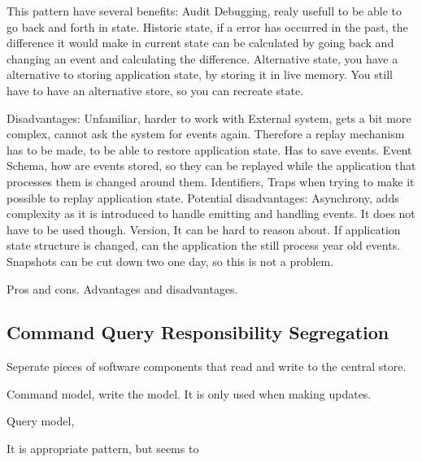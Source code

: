 This pattern have several benefits:
Audit
Debugging, realy usefull to be able to go back and forth in state.
Historic state, if a error has occurred in the past, the difference it would make in current state can be calculated by going back and changing an event and calculating the difference.
Alternative state, you have a alternative to storing application state, by storing it in live memory. You still have to have an alternative store, so you can recreate state.

Disadvantages:
Unfamiliar, harder to work with
External system, gets a bit more complex, cannot ask the system for events again. Therefore a replay mechanism has to be made, to be able to restore application state. Has to save events.
Event Schema, how are events stored, so they can be replayed while the application that processes them is changed around them.
Identifiers, Traps when trying to make it possible to replay application state.
Potential disadvantages:
Asynchrony, adds complexity as it is introduced to handle emitting and handling events. It does not have to be used though.
Version, It can be hard to reason about. If application state structure is changed, can the application the still process year old events. Snapshots can be cut down two one day, so this is not a problem.

Pros and cons. Advantages and disadvantages.

\subsection{Command Query Responsibility Segregation}
Seperate pieces of software components that read and write to the central store.

Command model, write the model. It is only used when making updates.

Query model, 

It is appropriate pattern, but seems to 


